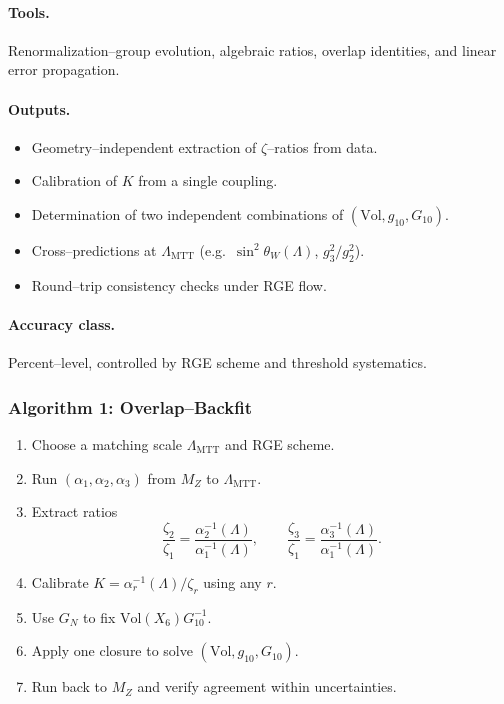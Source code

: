 \documentclass[11pt]{article}
\begin{document}
\paragraph{Tools.}
Renormalization--group evolution, algebraic ratios, overlap identities,
and linear error propagation.

\paragraph{Outputs.}
\begin{itemize}
  \item Geometry--independent extraction of $\zeta$--ratios from data.
  \item Calibration of $K$ from a single coupling.
  \item Determination of two independent combinations of
        $(\mathrm{Vol}, g_{10}, G_{10})$.
  \item Cross--predictions at $\Lambda_{\mathrm{MTT}}$
        (e.g.\ $\sin^2\theta_W(\Lambda)$, $g_3^2/g_2^2$).
  \item Round--trip consistency checks under RGE flow.
\end{itemize}

\paragraph{Accuracy class.}
Percent--level, controlled by RGE scheme and threshold systematics.

\subsubsection{Algorithm 1: Overlap--Backfit}

\begin{enumerate}
  \item Choose a matching scale $\Lambda_{\mathrm{MTT}}$ and RGE scheme.
  \item Run $(\alpha_1,\alpha_2,\alpha_3)$ from $M_Z$ to
        $\Lambda_{\mathrm{MTT}}$.
  \item Extract ratios
        \[
        \frac{\zeta_2}{\zeta_1}
        = \frac{\alpha_2^{-1}(\Lambda)}{\alpha_1^{-1}(\Lambda)},
        \qquad
        \frac{\zeta_3}{\zeta_1}
        = \frac{\alpha_3^{-1}(\Lambda)}{\alpha_1^{-1}(\Lambda)}.
        \]
  \item Calibrate $K = \alpha_r^{-1}(\Lambda)/\zeta_r$ using any $r$.
  \item Use $G_N$ to fix $\mathrm{Vol}(X_6) G_{10}^{-1}$.
  \item Apply one closure to solve $(\mathrm{Vol}, g_{10}, G_{10})$.
  \item Run back to $M_Z$ and verify agreement within uncertainties.
\end{enumerate}
\end{document}
